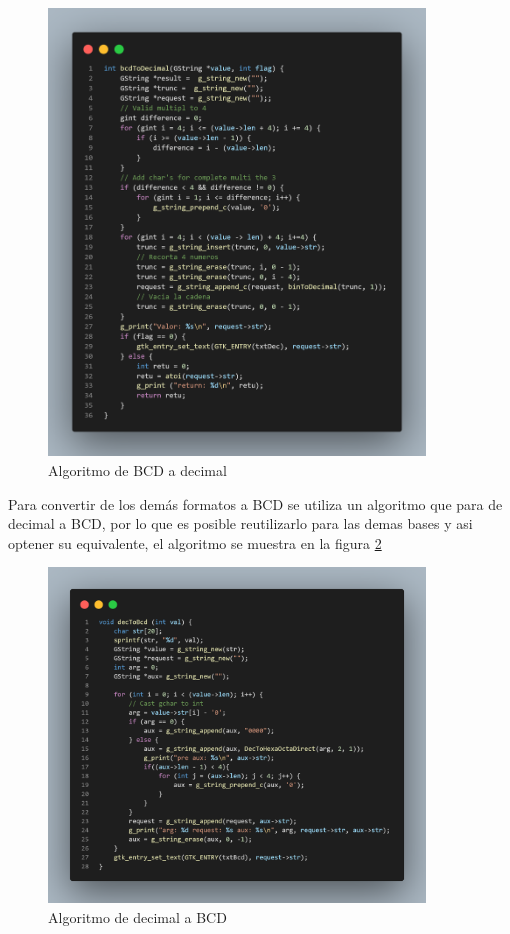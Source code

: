 \documentclass[letterpaper,12pt]{extarticle}%
\begin{document}
			\begin{figure}[H]
			\begin{center}
			\includegraphics[width=10cm]{imag//algBcdToDec.png}
			\caption{Algoritmo de BCD a decimal}
			\label{algBcdToDec}
			\end{center}
			\end{figure}

			Para convertir de los demás formatos a BCD se utiliza un algoritmo que para de decimal a BCD, por lo que es 
			posible reutilizarlo para las demas bases y asi optener su equivalente, el algoritmo se muestra en la figura
			\ref{decToBcd} 

			\begin{figure}[H]
			\begin{center}
			\includegraphics[width=10cm]{imag//algDecToBcd.png}
			\caption{Algoritmo de decimal a BCD}
			\label{decToBcd}
			\end{center}
			\end{figure}
	
\end{document}
